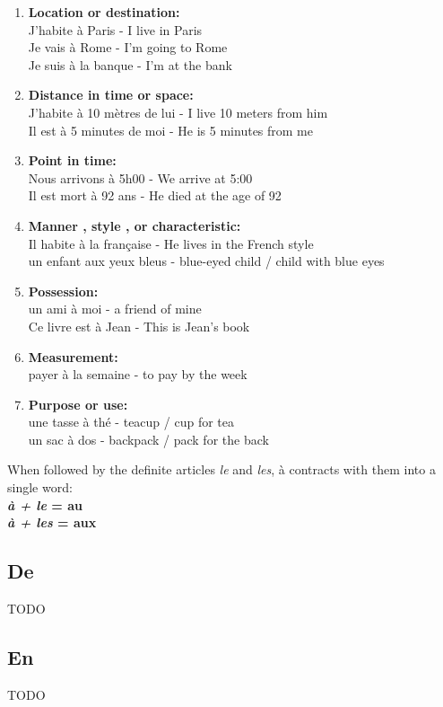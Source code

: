 \begin{enumerate}
\item{\textbf{Location or destination:}\\
J'habite \`{a} Paris - I live in Paris\\
Je vais \`{a} Rome - I'm going to Rome\\
Je suis \`{a} la banque - I'm at the bank}

\item{\textbf{Distance in time or space:}\\
J'habite \`{a} 10 m\`{e}tres de lui - I live 10 meters from him\\
Il est \`{a} 5 minutes de moi - He is 5 minutes from me}

\item{\textbf{Point in time:}\\
Nous arrivons \`{a} 5h00 - We arrive at 5:00\\
Il est mort \`{a} 92 ans - He died at the age of 92}

\item{\textbf{Manner , style , or characteristic:}\\
Il habite \`{a} la fran\c{c}aise - He lives in the French style\\
un enfant aux yeux bleus - blue-eyed child / child with blue eyes}

\item{\textbf{Possession:}\\
un ami \`{a} moi - a friend of mine\\
Ce livre est \`{a} Jean - This is Jean's book}

\item{\textbf{Measurement:}\\
payer \`{a} la semaine - to pay by the week}

\item{\textbf{Purpose or use:}\\
une tasse \`{a} th\'{e} - teacup / cup for tea\\
un sac \`{a} dos - backpack / pack for the back}
\end{enumerate}

\noindent When followed by the definite articles \emph{le}
and \emph{les}, \`a contracts with them into a single word:\\
\textbf{\emph{\`a + le} = au}   \\
\textbf{\emph{\`a + les} = aux} \\

\subsection{De}
TODO

\subsection{En}
TODO
